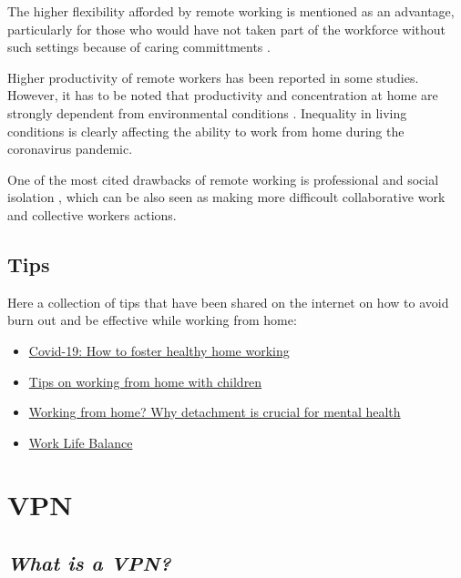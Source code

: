 \documentclass[
]{book}
\providecommand{\tightlist}{%
  \setlength{\itemsep}{0pt}\setlength{\parskip}{0pt}}
\begin{document}
The higher flexibility afforded by remote working is mentioned as an advantage, particularly for those who would have not taken part of the workforce without such settings because of caring committments \citep{olson1983remote}.

Higher productivity of remote workers has been reported in some studies. However, it has to be noted that productivity and concentration at home are strongly dependent from environmental conditions \citep{bailey2002review}. Inequality in living conditions is clearly affecting the ability to work from home during the coronavirus pandemic.

One of the most cited drawbacks of remote working is professional and social isolation \citep{bailey2002review}, which can be also seen as making more difficoult collaborative work and collective workers actions.

\hypertarget{tips}{%
\section{Tips}\label{tips}}

Here a collection of tips that have been shared on the internet on how to avoid burn out and be effective while working from home:

\begin{itemize}
\tightlist
\item
  \href{https://www.ucl.ac.uk/news/2020/apr/covid-19-how-foster-healthy-home-working}{Covid-19: How to foster healthy home working}
\item
  \href{https://www.timeshighereducation.com/blog/tips-working-home-children\#\%20}{Tips on working from home with children}
\item
  \href{https://theconversation.com/working-from-home-why-detachment-is-crucial-for-mental-health-135986}{Working from home? Why detachment is crucial for mental health}
\item
  \href{https://www.liverpool.ac.uk/researcher/work-life-balance/}{Work Life Balance}
\end{itemize}

\hypertarget{vpn}{%
\chapter{VPN}\label{vpn}}

\hypertarget{what-is-a-vpn}{%
\section{\texorpdfstring{\emph{What is a VPN?}}{What is a VPN?}}\label{what-is-a-vpn}}
\end{document}
